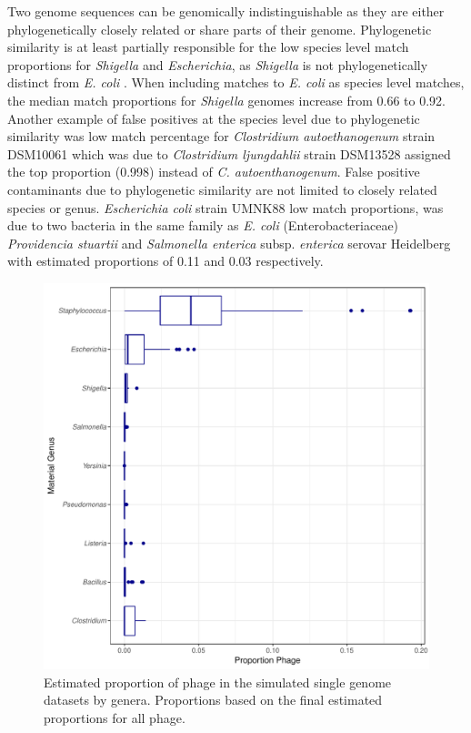 \documentclass[fleqn,10pt,lineno]{wlpeerj}\usepackage[]{graphicx}\usepackage[]{color}
\makeatletter
\def\maxwidth{ %
  \ifdim\Gin@nat@width>\linewidth
    \linewidth
  \else
    \Gin@nat@width
  \fi
}
\newenvironment{knitrout}{}{} %
\makeatother
\begin{document}
Two genome sequences can be genomically indistinguishable as they are either phylogenetically closely related or share parts of their genome.
Phylogenetic similarity is at least partially responsible for the low species level match proportions for  \textit{Shigella} and \textit{Escherichia}, as \textit{Shigella} is not phylogenetically distinct from \textit{E. coli} \citep{lan2002escherichia}.
When including matches to \textit{E. coli} as species level matches, the median match proportions for \textit{Shigella} genomes increase from 0.66 to 0.92. 
Another example of false positives at the species level due to phylogenetic similarity was low match percentage for \textit{Clostridium autoethanogenum} strain DSM10061 which was due to  \textit{Clostridium ljungdahlii} strain DSM13528 assigned the top proportion (0.998) instead of \textit{C. autoenthanogenum}. 
False positive contaminants due to phylogenetic similarity are not limited to closely related species or genus.
\textit{Escherichia coli} strain UMNK88 low match proportions, was due to two bacteria in the same family as \textit{E. coli} 
(Enterobacteriaceae) \textit{Providencia stuartii} and \textit{Salmonella enterica} subsp. \textit{enterica} serovar Heidelberg with estimated proportions of 0.11 and 0.03 respectively. 

\begin{knitrout}
\color{fgcolor}\begin{figure}
\includegraphics[width=\maxwidth]{figure/phage_prop-1} \caption[Estimated proportion of phage in the simulated single genome datasets by genera]{Estimated proportion of phage in the simulated single genome datasets by genera.  Proportions based on the final estimated proportions for all phage.}\label{fig:phage_prop}
\end{figure}


\end{knitrout}
\end{document}
